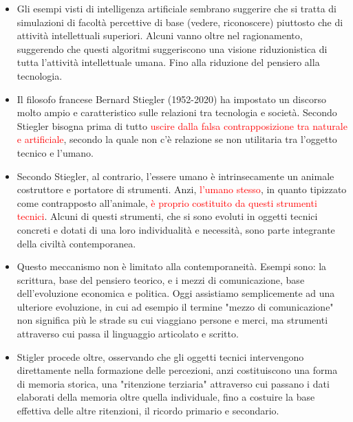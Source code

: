 \documentclass[xcolor=svgnames]{beamer}
\newcommand{\rosso}[1]{\textcolor{red}{#1}}
\renewcommand{\emph}{\rosso}
\begin{document}
\begin{frame}
  \begin{itemize}
  \item Gli esempi visti di intelligenza artificiale sembrano suggerire che si tratta di simulazioni di facoltà percettive di base (vedere, riconoscere) piuttosto che di attività intellettuali superiori. Alcuni vanno oltre nel ragionamento, suggerendo che questi algoritmi suggeriscono una visione riduzionistica di tutta l'attività intellettuale umana. Fino alla riduzione del pensiero alla tecnologia.
\item 
Il filosofo francese Bernard Stiegler (1952-2020) ha impostato un discorso molto ampio e caratteristico sulle relazioni tra tecnologia e società. Secondo Stiegler bisogna prima di tutto \emph{uscire dalla falsa contrapposizione tra naturale e artificiale}, secondo la quale non c'è relazione se non utilitaria tra l'oggetto tecnico e l'umano. 
\item
  Secondo Stiegler, al contrario, l'essere umano è intrinsecamente un animale costruttore e portatore di strumenti. Anzi, \emph{l'umano stesso}, in quanto tipizzato come contrapposto all'animale, \emph{è proprio costituito da questi strumenti tecnici}. Alcuni di questi strumenti, che si sono evoluti in oggetti tecnici concreti e dotati di una loro individualità e necessità, sono parte integrante della civiltà contemporanea.

  \item Questo meccanismo non è limitato alla contemporaneità. Esempi sono: la scrittura, base del pensiero teorico, e i mezzi di comunicazione, base dell'evoluzione economica e politica. Oggi assistiamo semplicemente ad una ulteriore evoluzione, in cui ad esempio il termine "mezzo di comunicazione" non significa più le strade su cui viaggiano persone e merci, ma strumenti attraverso cui passa il linguaggio articolato e scritto.
\item
Stigler procede oltre, osservando che gli oggetti tecnici intervengono direttamente nella formazione delle percezioni, anzi costituiscono una forma di memoria storica, una "ritenzione terziaria" attraverso cui passano i dati elaborati della memoria oltre quella individuale, fino a costuire la base effettiva delle altre ritenzioni, il ricordo primario e secondario.
  \end{itemize}
\end{frame}
\end{document}
